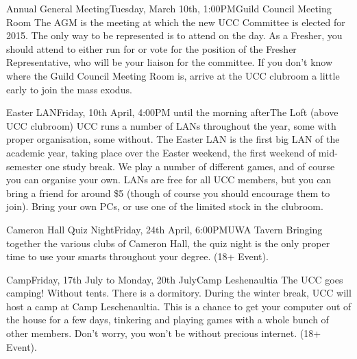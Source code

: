 \begin{event}{Annual General Meeting}{Tuesday, March 10th, 1:00PM}{Guild Council Meeting Room}
The AGM is the meeting at which the new UCC Committee is elected for 2015. The only way to be represented is to attend on the day. As a Fresher, you should attend to either run for or vote for the position of the Fresher Representative, who will be your liaison for the committee. If you don't know where the Guild Council Meeting Room is, arrive at the UCC clubroom a little early to join the mass exodus.
\end{event}

\begin{event}{Easter LAN}{Friday, 10th April, 4:00PM until the morning after}{The Loft (above UCC clubroom)}
UCC runs a number of LANs throughout the year, some with proper organisation, some without. The Easter LAN is the first big LAN of the academic year, taking place over the Easter weekend, the first weekend of mid-semester one study break. We play a number of different games, and of course you can organise your own. LANs are free for all UCC members, but you can bring a friend for around \$5 (though of course you should encourage them to join). Bring your own PCs, or use one of the limited stock in the clubroom.
\end{event}


\begin{event}{Cameron Hall Quiz Night}{Friday, 24th April, 6:00PM}{UWA Tavern}
Bringing together the various clubs of Cameron Hall, the quiz night is the only proper time to use your smarts throughout your degree.  (18+ Event).
\end{event}

\begin{event}{Camp}{Friday, 17th July to Monday, 20th July}{Camp Leshenaultia}
The UCC goes camping! Without tents. There is a dormitory. During the winter break, UCC will host a camp at Camp Leschenaultia. This is a chance to get your computer out of the house for a few days, tinkering and playing games with a whole bunch of other members. Don't worry, you won't be without precious internet. (18+ Event).
\end{event}

